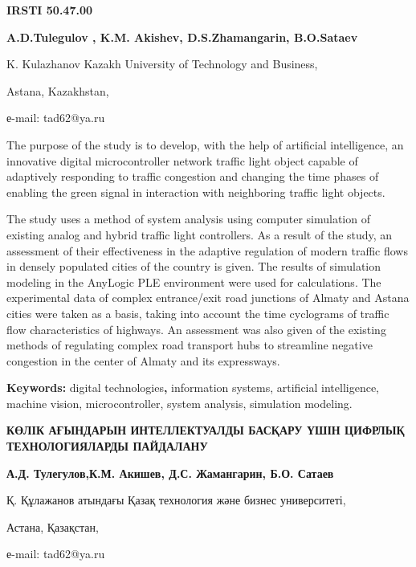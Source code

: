 \newpage
{\bfseries IRSTI 50.47.00}


\begin{center}
{\bfseries A.D.Tulegulov , K.M. Akishev, D.S.Zhamangarin, B.O.Sataev}

K. Kulazhanov Kazakh University of Technology and Business,

Astana, Kazakhstan,

е-mail: tad62@ya.ru
\end{center}

The purpose of the study is to develop, with the help of artificial
intelligence, an innovative digital microcontroller network traffic
light object capable of adaptively responding to traffic congestion and
changing the time phases of enabling the green signal in interaction
with neighboring traffic light objects.

The study uses a method of system analysis using computer simulation of
existing analog and hybrid traffic light controllers. As a result of the
study, an assessment of their effectiveness in the adaptive regulation
of modern traffic flows in densely populated cities of the country is
given. The results of simulation modeling in the AnyLogic PLE
environment were used for calculations. The experimental data of complex
entrance/exit road junctions of Almaty and Astana cities were taken as a
basis, taking into account the time cyclograms of traffic flow
characteristics of highways. An assessment was also given of the
existing methods of regulating complex road transport hubs to streamline
negative congestion in the center of Almaty and its expressways.

{\bfseries Keywords:} digital technologies{\bfseries ,} information systems,
artificial intelligence, machine vision, microcontroller, system
analysis, simulation modeling.

\begin{center}
{\large\bfseries КӨЛІК АҒЫНДАРЫН ИНТЕЛЛЕКТУАЛДЫ БАСҚАРУ ҮШІН ЦИФРЛЫҚ
ТЕХНОЛОГИЯЛАРДЫ ПАЙДАЛАНУ}

{\bfseries А.Д. Тулегулов,К.М. Акишев, Д.С. Жамангарин, Б.О. Сатаев}

Қ. Құлажанов атындағы Қазақ технология және бизнес университеті,

Астана, Қазақстан,

е-mail: tad62@ya.ru
\end{center}

